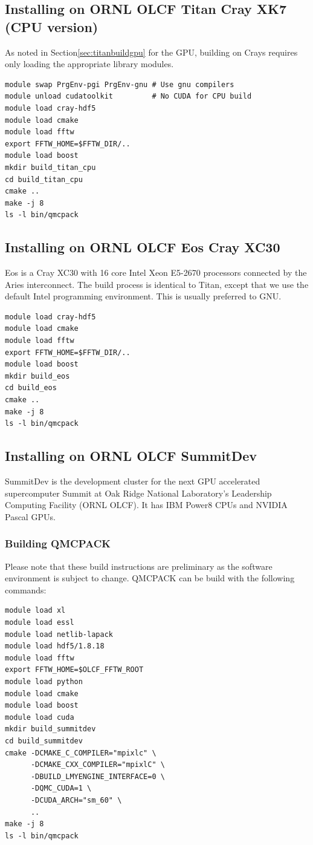 \subsection{Installing on ORNL OLCF Titan Cray XK7 (CPU version)}
As noted in Section\ref{sec:titanbuildgpu} for the GPU, building on
Crays requires only loading the appropriate library modules.

\begin{verbatim}
module swap PrgEnv-pgi PrgEnv-gnu # Use gnu compilers
module unload cudatoolkit         # No CUDA for CPU build
module load cray-hdf5
module load cmake
module load fftw
export FFTW_HOME=$FFTW_DIR/..
module load boost
mkdir build_titan_cpu
cd build_titan_cpu
cmake ..
make -j 8
ls -l bin/qmcpack
\end{verbatim}

\subsection{Installing on ORNL OLCF Eos Cray XC30}
Eos is a Cray XC30 with 16 core Intel Xeon E5-2670 processors connected
by the Aries interconnect. The build process is identical to Titan,
except that we use the default Intel programming environment. This is
usually preferred to GNU.
\begin{verbatim}
module load cray-hdf5
module load cmake
module load fftw
export FFTW_HOME=$FFTW_DIR/..
module load boost
mkdir build_eos
cd build_eos
cmake ..
make -j 8
ls -l bin/qmcpack
\end{verbatim}

\subsection{Installing on ORNL OLCF SummitDev}
SummitDev is the development cluster for the next GPU accelerated
supercomputer Summit at Oak Ridge National Laboratory's
Leadership Computing Facility  (ORNL OLCF). It has IBM Power8 CPUs and NVIDIA Pascal GPUs.

\subsubsection{Building QMCPACK}
Please note that these build instructions are preliminary as the
software environment is subject to change. QMCPACK can be build with the following commands:
\begin{verbatim}
module load xl
module load essl
module load netlib-lapack
module load hdf5/1.8.18
module load fftw
export FFTW_HOME=$OLCF_FFTW_ROOT
module load python
module load cmake
module load boost
module load cuda
mkdir build_summitdev
cd build_summitdev
cmake -DCMAKE_C_COMPILER="mpixlc" \
      -DCMAKE_CXX_COMPILER="mpixlC" \
      -DBUILD_LMYENGINE_INTERFACE=0 \
      -DQMC_CUDA=1 \
      -DCUDA_ARCH="sm_60" \
      ..
make -j 8
ls -l bin/qmcpack
\end{verbatim}

